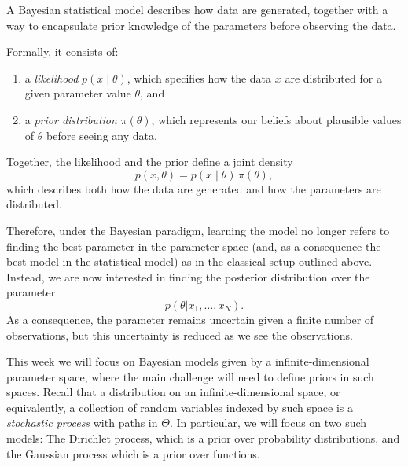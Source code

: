 \begin{definition}
A Bayesian statistical model describes how data are generated, together with a way to encapsulate prior knowledge of the parameters before observing the data.

Formally, it consists of:
\begin{enumerate}
  \item a \emph{likelihood} $p(x \mid \theta)$, which specifies how the data $x$ are distributed for a given parameter value $\theta$, and
  \item a \emph{prior distribution} $\pi(\theta)$, which represents our beliefs about plausible values of $\theta$ before seeing any data.
\end{enumerate}

Together, the likelihood and the prior define a joint density
\[
p(x,\theta) = p(x \mid \theta)\,\pi(\theta),
\]
which describes both how the data are generated and how the parameters are distributed.
\end{definition}

Therefore, under the Bayesian paradigm, learning the model no longer refers to finding the best parameter in the parameter space (and, as a consequence the best model in the statistical model) as in the classical setup outlined above. Instead, we are now interested in finding the posterior distribution over the parameter 
\begin{equation}
    p(\theta|x_1,\ldots,x_N).
\end{equation}
As a consequence, the parameter remains uncertain given a finite number of observations, but this uncertainty is reduced as we see the observations.

This week we will focus on Bayesian models given by a infinite-dimensional parameter space, where the main challenge will need to define priors in such spaces.  Recall that a distribution on an infinite-dimensional space, or equivalently, a collection of random variables indexed by such space is a \emph{stochastic process} with paths in $\Theta$. In particular, we will focus on two such models: The Dirichlet process, which is a prior over probability distributions, and the Gaussian process which is a prior over functions. 

